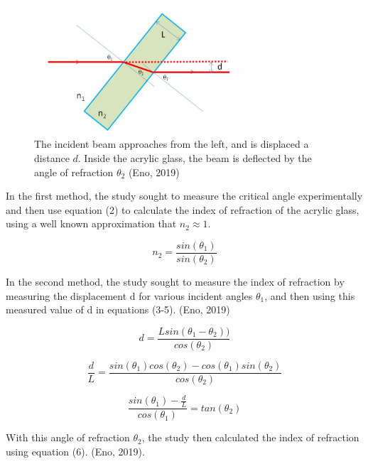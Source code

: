 \documentclass[colorlinks=true,pdfstartview=FitV,linkcolor=blue,
            citecolor=red,urlcolor=magenta]{basedoc}
\begin{document}
    \begin{figure}[!h]
      \begin{center}
      \includegraphics[width=3in]{resources/snells_law.png}
      \caption{The incident beam approaches from the left, and is displaced a distance $d$. Inside the acrylic glass, the beam is deflected by the angle of refraction $\theta_2$ (Eno, 2019)}
      \label{fig:snellslaw}
      \end{center}
    \end{figure}

  In the first method, the study sought to measure the critical angle experimentally and then use equation (2) to calculate the index of refraction of the acrylic glass, using a well known approximation that $n_2 \approx 1$.

    \begin{equation} \label{eq:snell_2}
      n_2 = \frac {sin(\theta_1)} {sin(\theta_2)}
    \end{equation}

  In the second method, the study sought to measure the index of refraction by measuring the displacement d for various incident angles $\theta_1$, and then using this measured value of d in equations (3-5). (Eno, 2019)

  \begin{equation} \label{eq:distance_d_1}
    d = \frac {L sin(\theta_1 - \theta_2 ))} {cos(\theta_2)}
  \end{equation}

  \begin{equation} \label{eq:distance_d_2}
    \frac {d} {L} = \frac {sin(\theta_1) cos(\theta_2 ) - cos(\theta_1) sin(\theta_2 )} {cos(\theta_2 )}
  \end{equation}

  \begin{equation} \label{eq:distance_d_3}
    \frac {sin(\theta_1) - \frac {d} {L}} {cos(\theta_1)} = tan(\theta_2 )
  \end{equation}

  With this angle of refraction $\theta_2$, the study then calculated the index of refraction using equation (6). (Eno, 2019).
\end{document}
